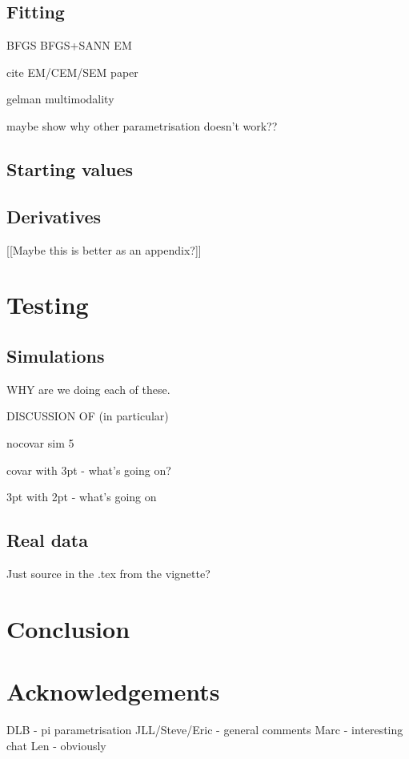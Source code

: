 \subsection{Fitting}

BFGS
BFGS+SANN
EM

cite EM/CEM/SEM paper

gelman multimodality

maybe show why other parametrisation doesn't work??


\subsection{Starting values}




\subsection{Derivatives}
[[Maybe this is better as an appendix?]]


\section{Testing}

\subsection{Simulations}

WHY are we doing each of these.

DISCUSSION OF (in particular)

nocovar sim 5

covar with 3pt - what's going on?

3pt with 2pt - what's going on

\subsection{Real data}

Just source in the .tex from the vignette?




\section{Conclusion}


\section{Acknowledgements}
DLB - pi parametrisation
JLL/Steve/Eric - general comments
Marc - interesting chat
Len - obviously



